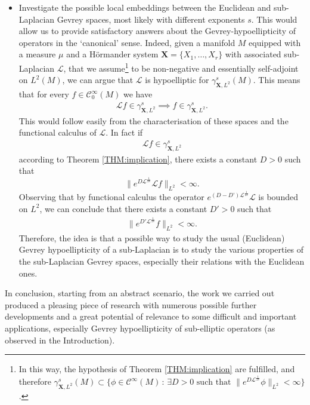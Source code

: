 \documentclass[12pt,oneside,a4paper]{book}
\numberwithin{equation}{section}     %
\theoremstyle{plain}
\theoremstyle{definition}
\newcommand{\slp}{{\mathcal L}}
\begin{document}
\begin{itemize}
	\item Investigate the possible local embeddings between the Euclidean and sub-Laplacian Gevrey spaces, most likely with different exponents $s$. This would allow us to provide satisfactory answers about the Gevrey-hypoellipticity of operators in the `canonical' sense. Indeed, given a manifold $M$ equipped with a measure $\mu$ and a H\"ormander system $\mathbf{X} =\{X_1,\dots,X_r\}$ with associated sub-Laplacian $\slp$, that we assume\footnote{In this way, the hypothesis of Theorem \ref{THM:implication} are fulfilled, and therefore $\gamma^s_{\mathbf{X},L^2}(M)\subset\big\{\phi\in\mathcal C^\infty(M)\,:\,\exists D>0\text{ such that }\|e^{D\slp^{\frac{1}{2s}}}\phi\|_{L^2}<\infty\big\}$.
	} to be non-negative and essentially self-adjoint on $L^2(M)$, we can argue that $\slp$ is hypoelliptic for $\gamma_{\mathbf{X},L^2}^s (M)$. This means that for every $f \in \mathcal{C}_0^\infty (M)$
	we have 
	\begin{align*}
	\slp f \in \gamma_{\mathbf{X},L^2}^s \implies f \in \gamma_{\mathbf{X},L^2}^s.
	\end{align*}
	This would follow easily from the characterisation of these spaces and the functional calculus of $\slp$. In fact if
	\begin{align*}
	\slp f \in \gamma_{\mathbf{X},L^2}^s
	\end{align*}
	according to Theorem \ref{THM:implication}, there exists a constant $D>0$ such that
	$$
	\| e^{D\slp^{\frac{1}{2s}}} \slp f\|_{L^2}<\infty.
	$$
	Observing that by functional calculus the operator $e^{(D-D’)\slp^{\frac{1}{2s}}}\slp$ is bounded on $L^2$, we can conclude that there exists a constant $D'>0$ such that 
	\begin{align*}
	\| e^{D'\slp^\frac{1}{2s}} f\|_{L^2}<\infty.
	\end{align*}
	Therefore, the idea is that a possible way to study the usual (Euclidean) Gevrey hypoellipticity of a sub-Laplacian is to study the various properties of the sub-Laplacian Gevrey spaces, especially their relations with the Euclidean ones.
	
\end{itemize}

In conclusion, starting from an abstract scenario, the work we carried out produced a pleasing piece of research with numerous possible further developments and a great potential of relevance to some difficult and important applications, especially Gevrey hypoellipticity of sub-elliptic operators (as observed in the Introduction). 
\end{document}

